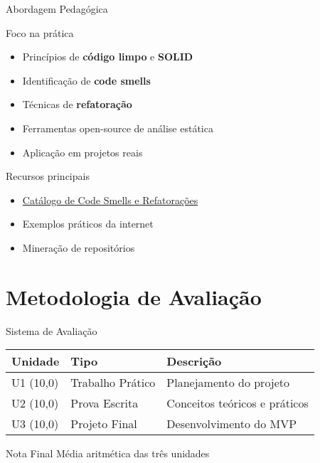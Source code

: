 \documentclass[10pt, aspectratio=169]{beamer}
\begin{document}
\begin{frame}{Abordagem Pedagógica}
\begin{block}{Foco na prática}
\begin{itemize}
    \item Princípios de \textbf{código limpo} e \textbf{SOLID}
    \item Identificação de \textbf{code smells}
    \item Técnicas de \textbf{refatoração}
    \item Ferramentas open-source de análise estática
    \item Aplicação em projetos reais
\end{itemize}
\end{block}

\begin{block}{Recursos principais}
\begin{itemize}
    \item \href{https://luzkan.github.io/smells/}{Catálogo de Code Smells e Refatorações}
    \item Exemplos práticos da internet
    \item Mineração de repositórios
\end{itemize}
\end{block}
\end{frame}

\section{Metodologia de Avaliação}
\begin{frame}{Sistema de Avaliação}
\begin{table}
\centering
\begin{tabular}{lll}
\toprule
\textbf{Unidade} & \textbf{Tipo} & \textbf{Descrição} \\
\midrule
U1 (10,0) & Trabalho Prático & Planejamento do projeto \\
U2 (10,0) & Prova Escrita & Conceitos teóricos e práticos \\
U3 (10,0) & Projeto Final & Desenvolvimento do MVP \\
\bottomrule
\end{tabular}
\end{table}

\begin{block}{Nota Final}
Média aritmética das três unidades
\end{block}
\end{frame}
\end{document}
